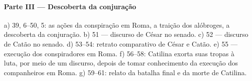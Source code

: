 \paragraph{Parte III --- Descoberta da conjuração}

a)	39, 6--50, 5: as ações da conspiração em Roma, a traição dos alóbroges, a
descoberta da conjuração.  b)	51 --- discurso de César no senado.  c)	52 ---
discurso de Catão no senado.  d)	53--54: retrato comparativo de César e Catão.
e)	55 --- execução dos conspiradores em Roma.  f)	56--58: Catilina exorta
suas tropas à luta, por meio de um discurso, depois de tomar conhecimento da
execução dos companheiros em Roma.  g)	59--61: relato da batalha final e da
morte de Catilina. 

